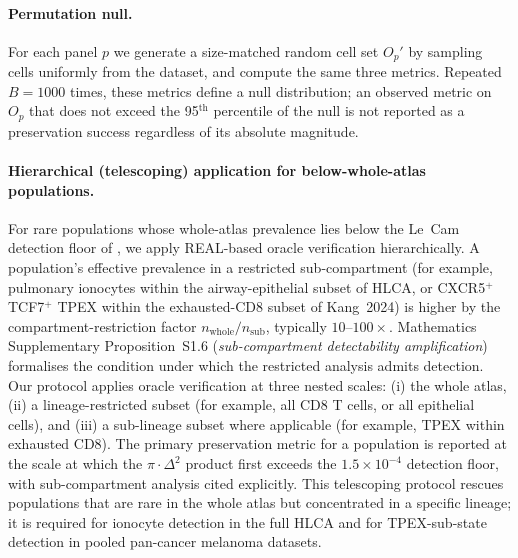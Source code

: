 \paragraph*{Permutation null.}
For each panel $p$ we generate a size-matched random cell set $O_p'$
by sampling cells uniformly from the dataset, and compute the same
three metrics. Repeated $B = 1000$ times, these metrics define a
null distribution; an observed metric on $O_p$ that does not exceed
the 95$^\mathrm{th}$ percentile of the null is not reported as a
preservation success regardless of its absolute magnitude.

\paragraph*{Hierarchical (telescoping) application for below-whole-atlas populations.}
For rare populations whose whole-atlas prevalence lies below the
Le~Cam detection floor of , we apply
REAL-based oracle verification hierarchically. A population's effective
prevalence in a restricted sub-compartment (for example, pulmonary
ionocytes within the airway-epithelial subset of HLCA, or
CXCR5$^+$TCF7$^+$ TPEX within the exhausted-CD8 subset of Kang~2024)
is higher by the compartment-restriction factor
$n_{\text{whole}}/n_{\text{sub}}$, typically $10$--$100\times$.
Mathematics Supplementary Proposition~S1.6 (\emph{sub-compartment
detectability amplification}) formalises the condition under which
the restricted analysis admits detection. Our protocol applies
oracle verification at three nested scales: (i) the whole atlas,
(ii) a lineage-restricted subset (for example, all CD8 T cells,
or all epithelial cells), and (iii) a sub-lineage subset where
applicable (for example, TPEX within exhausted CD8). The primary
preservation metric for a population is reported at the scale at
which the $\pi\cdot\Delta^2$ product first exceeds the
$1.5\times10^{-4}$ detection floor, with sub-compartment analysis
cited explicitly. This telescoping protocol rescues populations
that are rare in the whole atlas but concentrated in a specific
lineage; it is required for ionocyte detection in the full HLCA
and for TPEX-sub-state detection in pooled pan-cancer melanoma
datasets.

